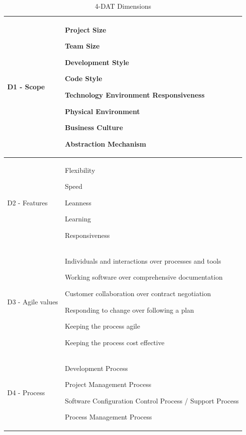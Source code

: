 \begin{table} [H]
\caption{4-DAT Dimensions}
\label{table:4dat_dimensions}
\begin{tabular}{ | p{3cm} | p{11cm} |} \hline
	D1 - Scope & \begin{inparaenum} [a\upshape)]
		\item Project Size
		\item Team Size
		\item Development Style
		\item Code Style
		\item Technology Environment Responsiveness
		\item Physical Environment
		\item Business Culture
		\item Abstraction Mechanism
	\end{inparaenum} \\ \hline
	D2 - Features & \begin{inparaenum} [a\upshape)]
		\item Flexibility
		\item Speed
		\item Leanness
		\item Learning
		\item Responsiveness
	\end{inparaenum} \\ \hline
	D3 - Agile values & \begin{inparaenum} [a\upshape)]
		\item Individuals and interactions over processes and tools
		\item Working software over comprehensive documentation
		\item Customer collaboration over contract negotiation
		\item Responding to change over following a plan
		\item Keeping the process agile
		\item Keeping the process cost effective
	\end{inparaenum} \\ \hline
	D4 - Process & \begin{inparaenum} [a\upshape)]
		\item Development Process
		\item Project Management Process
		\item Software Configuration Control Process / Support Process
		\item Process Management Process
	\end{inparaenum}\\ 
	\hline
\end{tabular}
\end{table}

